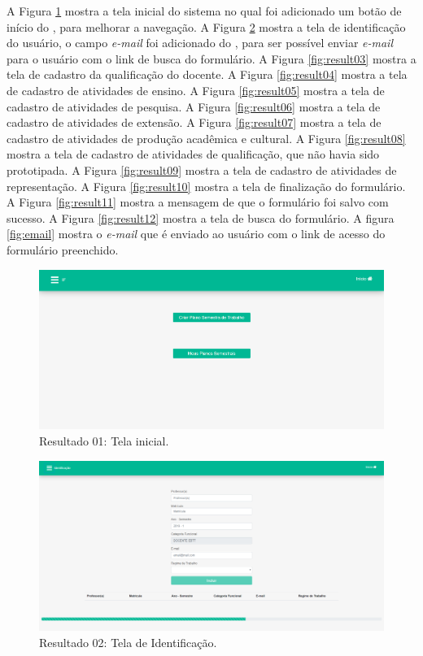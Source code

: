 A Figura \ref{fig:result01} mostra a tela inicial do sistema no qual foi adicionado um botão de início do , para melhorar a navegação.
A Figura \ref{fig:result02} mostra a tela de identificação do usuário, o campo \textit{e-mail} foi adicionado do , para ser possível enviar \textit{e-mail} para o usuário com o link de busca do formulário.
A Figura \ref{fig:result03} mostra a tela de cadastro da qualificação do docente.
A Figura \ref{fig:result04} mostra a tela de cadastro de atividades de ensino.
A Figura \ref{fig:result05} mostra a tela de cadastro de atividades de pesquisa.
A Figura \ref{fig:result06} mostra a tela de cadastro de atividades de extensão.
A Figura \ref{fig:result07} mostra a tela de cadastro de atividades de produção acadêmica e cultural.
A Figura \ref{fig:result08} mostra a tela de cadastro de atividades de qualificação, que não havia sido prototipada.
A Figura \ref{fig:result09} mostra a tela de cadastro de atividades de representação.
A Figura \ref{fig:result10} mostra a tela de finalização do formulário.
A Figura \ref{fig:result11} mostra a mensagem de que o formulário foi salvo com sucesso.
A Figura \ref{fig:result12} mostra a tela de busca do formulário.
A figura \ref{fig:email} mostra o \textit{e-mail} que é enviado ao usuário com o link de acesso do formulário preenchido.


\begin{figure}[htb]
    \centering
    \includegraphics[width=.99\textwidth]{img/pagina_inicial.PNG}
    \caption[Resultado 01: Tela inicial]{Resultado 01: Tela inicial.}
    \label{fig:result01}
\end{figure}

\begin{figure}[htb]
    \centering
    \includegraphics[width=.99\textwidth]{img/pagina_identificacao.PNG}
    \caption[Resultado 02: Tela de Identificação]{Resultado 02: Tela de Identificação.}
    \label{fig:result02}
\end{figure}

